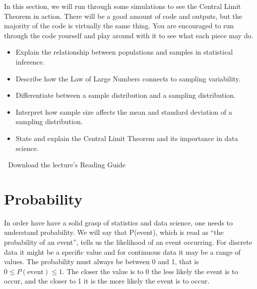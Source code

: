\documentclass[
  letterpaper,
  DIV=11,
  numbers=noendperiod]{scrreprt}
\providecommand{\tightlist}{%
  \setlength{\itemsep}{0pt}\setlength{\parskip}{0pt}}
\begin{document}
In this section, we will run through some simulations to see the Central
Limit Theorem in action. There will be a good amount of code and
outputs, but the majority of the code is virtually the same thing. You
are encouraged to run through the code yourself and play around with it
to see what each piece may do.

\begin{itemize}
\tightlist
\item
  Explain the relationship between populations and samples in
  statistical inference.
\item
  Describe how the Law of Large Numbers connects to sampling
  variability.
\item
  Differentiate between a sample distribution and a sampling
  distribution.
\item
  Interpret how sample size affects the mean and standard deviation of a
  sampling distribution.
\item
  State and explain the Central Limit Theorem and its importance in data
  science.
\end{itemize}

\begin{tcolorbox}[enhanced jigsaw, leftrule=.75mm, arc=.35mm, coltitle=black, rightrule=.15mm, bottomrule=.15mm, toprule=.15mm, left=2mm, colbacktitle=quarto-callout-tip-color!10!white, title=\textcolor{quarto-callout-tip-color}{\faLightbulb}\hspace{0.5em}{Supplemental Material}, toptitle=1mm, breakable, colframe=quarto-callout-tip-color-frame, bottomtitle=1mm, titlerule=0mm, colback=white, opacityback=0, opacitybacktitle=0.6]

📄 Download the lecture's Reading Guide

\end{tcolorbox}

\section{Probability}\label{probability}

In order have have a solid grasp of statistics and data science, one
needs to understand probability. We will say that P(event), which is
read as ``the probability of an event'', tells us the likelihood of an
event occurring. For discrete data it might be a specific value and for
continuous data it may be a range of values. The probability must always
be between 0 and 1, that is \(0\leq P(\text{event})\leq 1\). The closer
the value is to 0 the less likely the event is to occur, and the closer
to 1 it is the more likely the event is to occur.
\end{document}
